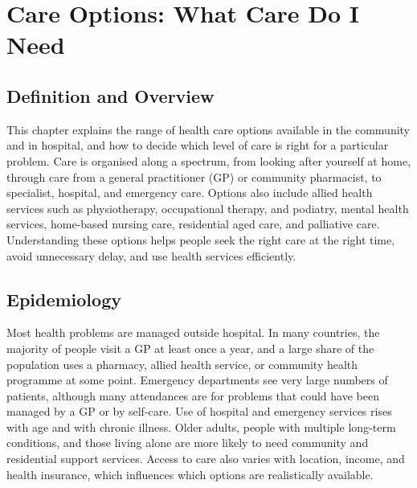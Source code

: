 \chapter{Care Options: What Care Do I Need}

\section*{Definition and Overview}
This chapter explains the range of health care options available in the community and in hospital, and how to decide which level of care is right for a particular problem. Care is organised along a spectrum, from looking after yourself at home, through care from a general practitioner (GP) or community pharmacist, to specialist, hospital, and emergency care. Options also include allied health services such as physiotherapy, occupational therapy, and podiatry, mental health services, home-based nursing care, residential aged care, and palliative care. Understanding these options helps people seek the right care at the right time, avoid unnecessary delay, and use health services efficiently.

\section*{Epidemiology}
Most health problems are managed outside hospital. In many countries, the majority of people visit a GP at least once a year, and a large share of the population uses a pharmacy, allied health service, or community health programme at some point. Emergency departments see very large numbers of patients, although many attendances are for problems that could have been managed by a GP or by self-care. Use of hospital and emergency services rises with age and with chronic illness. Older adults, people with multiple long-term conditions, and those living alone are more likely to need community and residential support services. Access to care also varies with location, income, and health insurance, which influences which options are realistically available.

